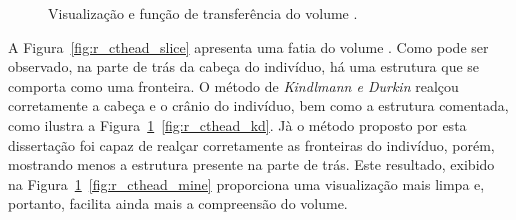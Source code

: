 \begin{figure}[h]
	\centering
	\caption{Visualização e função de transferência do volume .}
	\label{fig:r_cthead}
\end{figure}

	A Figura~\ref{fig:r_cthead_slice} apresenta uma fatia do volume . Como pode ser observado, na parte de trás da cabeça do indivíduo, há uma estrutura que se comporta como uma fronteira. O método de \textit{Kindlmann e Durkin} realçou corretamente a cabeça e o crânio do indivíduo, bem como a estrutura comentada, como ilustra a Figura~\ref{fig:r_cthead}~\ref{fig:r_cthead_kd}. Jà o método proposto por esta dissertação foi capaz de realçar corretamente as fronteiras do indivíduo, porém, mostrando menos a estrutura presente na parte de trás. Este resultado, exibido na Figura~\ref{fig:r_cthead}~\ref{fig:r_cthead_mine} proporciona uma visualização mais limpa e, portanto, facilita ainda mais a compreensão do volume.

